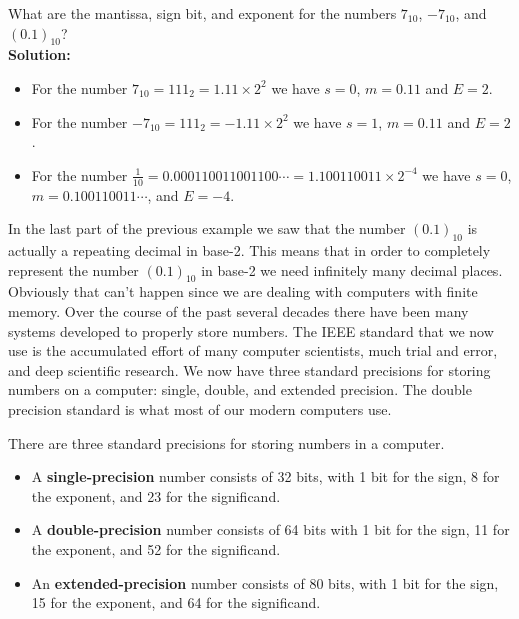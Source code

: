 \begin{example}
    What are the mantissa, sign bit, and exponent for the numbers $7_{10}$, $-7_{10}$,
    and $(0.1)_{10}$? \\{\bf Solution:} 
    \begin{itemize}
        \item For the number $7_{10}=111_2 = 1.11 \times 2^2$ we have $s=0$, $m=0.11$ and $E=2$.
        \item For the number $-7_{10}=111_2 = -1.11 \times 2^2$ we have $s=1$, $m=0.11$ and $E=2$.
        \item For the number $\frac{1}{10} = 0.000110011001100\cdots = 1.100110011 \times 2^{-4}$
            we have $s=0$, $m=0.100110011\cdots$, and $E = -4$.
    \end{itemize}
\end{example}

In the last part of the previous example we saw that the number $(0.1)_{10}$ is actually a
repeating decimal in base-2.  This means that in order to completely represent the number
$(0.1)_{10}$ in base-2 we need infinitely many decimal places.  Obviously that can't
happen since we are dealing with computers with finite memory.  Over the course of the
past several decades there have been many systems developed to properly store numbers.
The IEEE standard that we now use is the accumulated effort of many computer scientists,
much trial and error, and deep scientific research.  We now have three standard precisions
for storing numbers on a computer: single, double, and extended precision.  The double
precision standard is what most of our modern computers use.

\begin{definition}
    There are three standard precisions for storing numbers in a computer.
    \begin{itemize}
        \item A {\bf single-precision} number consists of 32 bits, with 1 bit for the
            sign, 8 for the exponent, and 23 for the significand.
        \item A {\bf double-precision} number consists of 64 bits with 1 bit for the sign,
            11 for the exponent, and 52 for the significand.
        \item An {\bf extended-precision} number consists of 80 bits, with 1 bit for the
            sign, 15 for the exponent, and 64 for the significand.
    \end{itemize}
\end{definition}

